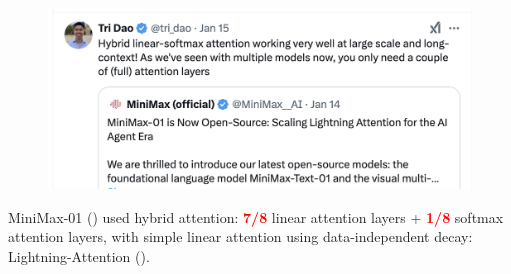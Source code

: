 \begin{frame}{}
    \begin{figure}
        \centering
        \includegraphics[width=.95\linewidth]{figure/hybrid_twitter.png}
    \end{figure}
    
    MiniMax-01 (\cite{minimax2025minimax01scalingfoundationmodels}) used hybrid attention: \textcolor{red}{\textbf{7/8}} linear attention layers + \textcolor{red}{\textbf{1/8}} softmax attention layers, with simple linear attention using data-independent decay: Lightning-Attention (\cite{Qin2024VariousLC}).
\end{frame}


